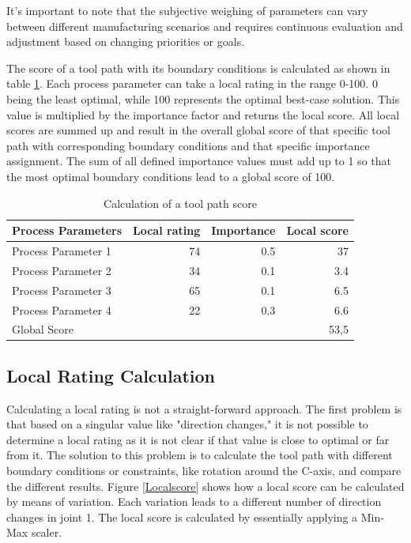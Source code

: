 It's important to note that the subjective weighing of parameters can vary between different manufacturing scenarios and requires continuous evaluation and adjustment based on changing priorities or goals.

The score of a tool path with its boundary conditions is calculated as shown in table \ref{weighting}. Each process parameter can take a local rating in the range 0-100. 0 being the least optimal, while 100 represents the optimal best-case solution. This value is multiplied by the importance factor and returns the local score. 
All local scores are summed up and result in the overall global score of that specific tool path with corresponding boundary conditions and that specific importance assignment.
The sum of all defined importance values must add up to 1 so that the most optimal boundary conditions lead to a global score of 100.


\begin{table}[H]
	\centering
	\begin{tabular}{||l|r|r|r||}
		Process Parameters & Local rating & Importance & Local score\\
		\hline
		\hline
		\hline
		
		Process Parameter 1 & 74 & 0.5 & 37\\
		Process Parameter 2 & 34& 0.1&3.4\\
		Process Parameter 3& 65& 0.1&6.5\\
		Process Parameter 4& 22&0.3&6.6\\
		\hline
		\hline
		\hline
		Global Score& & &53,5\\
		\hline
		\hline
	\end{tabular}
	
	\caption{Calculation of a tool path score}
	\label{weighting}
\end{table}


\subsection{Local Rating Calculation}\label{LRC}
Calculating a local rating is not a straight-forward approach. The first problem is that based on a singular value like "direction changes," it is not possible to determine a local rating as it is not clear if that value is close to optimal or far from it.
The solution to this problem is to calculate the tool path with different boundary conditions or constraints, like rotation around the C-axis, and compare the different results.
Figure \ref{Localscore} shows how a local score can be calculated by means of variation. Each variation leads to a different number of direction changes in joint 1. The local score is calculated by essentially applying a Min-Max scaler.

